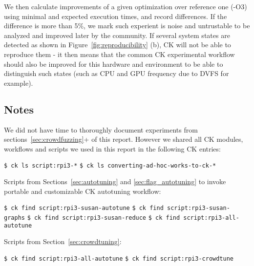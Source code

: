We then calculate improvements of a given optimization over reference one (-O3)
using minimal and expected execution times, and record differences.
%
If the difference is more than 5\%, we mark such experient is noise and untrustable 
to be analyzed and improved later by the community.
%
If several system states are detected as shown in Figure~\ref{fig:reproducibility} (b),
CK will not be able to reproduce them - it then means that the common CK experimental workflow
should also be improved for this hardware and environment to be able to distinguish such
states (such as CPU and GPU frequency due to DVFS for example).

\subsection{Notes}
\label{notes}

We did not have time to thoroughly document experiments from sections~\ref{sec:crowdfuzzing}+ of this report.
However we shared all CK modules, workflows and scripts we used in this report 
in the following CK entries:

\begin{flushleft}
\texttt{\$ ck ls script:rpi3-*} \newline
\texttt{\$ ck ls converting-ad-hoc-works-to-ck-*} \newline
\end{flushleft}

Scripts from Sections~\ref{sec:autotuning} and \ref{sec:flag_autotuning}
to invoke portable and customizable CK autotuning workflow:

\begin{flushleft}
\texttt{\$ ck find script:rpi3-susan-autotune} \newline
\texttt{\$ ck find script:rpi3-susan-graphs} \newline
\texttt{\$ ck find script:rpi3-susan-reduce} \newline
\texttt{\$ ck find script:rpi3-all-autotune} \newline
\end{flushleft}

Scripts from Section~\ref{sec:crowdtuning}:

\begin{flushleft}
\texttt{\$ ck find script:rpi3-all-autotune} \newline
\texttt{\$ ck find script:rpi3-crowdtune} \newline
\end{flushleft}

